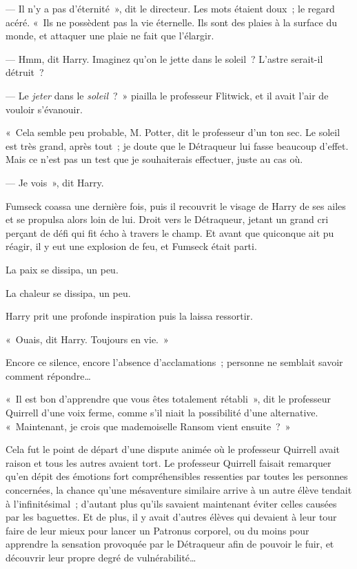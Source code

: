 --- Il n'y a pas d'éternité~», dit le directeur. Les mots étaient doux~; le regard acéré. «~Ils ne possèdent pas la vie éternelle. Ils sont des plaies à la surface du monde, et attaquer une plaie ne fait que l'élargir.

--- Hmm, dit Harry. Imaginez qu'on le jette dans le soleil~? L'astre serait-il détruit~?

--- Le \emph{jeter} dans le \emph{soleil}~?~» piailla le professeur Flitwick, et il avait l'air de vouloir s'évanouir.

«~Cela semble peu probable, M. Potter, dit le professeur d'un ton sec. Le soleil est très grand, après tout~; je doute que le Détraqueur lui fasse beaucoup d'effet. Mais ce n'est pas un test que je souhaiterais effectuer, juste au cas où.

--- Je vois~», dit Harry.

Fumseck coassa une dernière fois, puis il recouvrit le visage de Harry de ses ailes et se propulsa alors loin de lui. Droit vers le Détraqueur, jetant un grand cri perçant de défi qui fit écho à travers le champ. Et avant que quiconque ait pu réagir, il y eut une explosion de feu, et Fumseck était parti.

La paix se dissipa, un peu.

La chaleur se dissipa, un peu.

Harry prit une profonde inspiration puis la laissa ressortir.

«~Ouais, dit Harry. Toujours en vie.~»

Encore ce silence, encore l'absence d'acclamations~; personne ne semblait savoir comment répondre…

«~Il est bon d'apprendre que vous êtes totalement rétabli~», dit le professeur Quirrell d'une voix ferme, comme s'il niait la possibilité d'une alternative. «~Maintenant, je crois que mademoiselle Ransom vient ensuite~?~»

Cela fut le point de départ d'une dispute animée où le professeur Quirrell avait raison et tous les autres avaient tort. Le professeur Quirrell faisait remarquer qu'en dépit des émotions fort compréhensibles ressenties par toutes les personnes concernées, la chance qu'une mésaventure similaire arrive à un autre élève tendait à l'infinitésimal~; d'autant plus qu'ils savaient maintenant éviter celles causées par les baguettes. Et de plus, il y avait d'autres élèves qui devaient à leur tour faire de leur mieux pour lancer un Patronus corporel, ou du moins pour apprendre la sensation provoquée par le Détraqueur afin de pouvoir le fuir, et découvrir leur propre degré de vulnérabilité…

